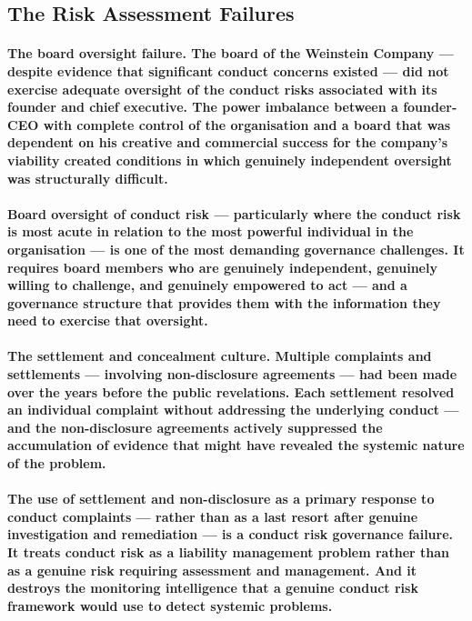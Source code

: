 \subsection{The Risk Assessment Failures}
\paragraph{\textbf{The board oversight failure}. The board of the Weinstein Company — despite evidence that significant conduct concerns existed — did not exercise adequate oversight of the conduct risks associated with its founder and chief executive. The power imbalance between a founder-CEO with complete control of the organisation and a board that was dependent on his creative and commercial success for the company's viability created conditions in which genuinely independent oversight was structurally difficult.}
\paragraph{Board oversight of conduct risk — particularly where the conduct risk is most acute in relation to the most powerful individual in the organisation — is one of the most demanding governance challenges. It requires board members who are genuinely independent, genuinely willing to challenge, and genuinely empowered to act — and a governance structure that provides them with the information they need to exercise that oversight.}
\paragraph{\textbf{The settlement and concealment culture}. Multiple complaints and settlements — involving non-disclosure agreements — had been made over the years before the public revelations. Each settlement resolved an individual complaint without addressing the underlying conduct — and the non-disclosure agreements actively suppressed the accumulation of evidence that might have revealed the systemic nature of the problem.}
\paragraph{The use of settlement and non-disclosure as a primary response to conduct complaints — rather than as a last resort after genuine investigation and remediation — is a conduct risk governance failure. It treats conduct risk as a liability management problem rather than as a genuine risk requiring assessment and management. And it destroys the monitoring intelligence that a genuine conduct risk framework would use to detect systemic problems.}
